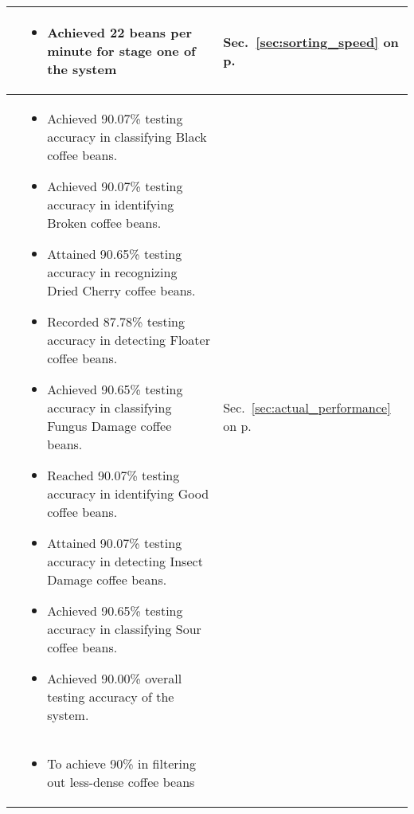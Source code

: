 \begin{center}
{\begin{tabularx}{\textwidth}{p{}|p{}|p{}}
			
			\Paste{SO2} & 

			\begin{itemize}
				\item Achieved 22 beans per minute for stage one of the system
			\end{itemize} 
	
			& Sec.~\ref{sec:sorting_speed} on p.~\pageref{sec:sorting_speed}
			\\ \hline
			
			\Paste{SO3} & 
			\begin{itemize}
				\item Achieved 90.07\% testing accuracy in classifying Black coffee beans.
				\item Achieved 90.07\% testing accuracy in identifying Broken coffee beans.
				\item Attained 90.65\% testing accuracy in recognizing Dried Cherry coffee beans.
				\item Recorded 87.78\% testing accuracy in detecting Floater coffee beans.
				\item Achieved 90.65\% testing accuracy in classifying Fungus Damage coffee beans.
				\item Reached  90.07\% testing accuracy in identifying Good coffee beans.
				\item Attained 90.07\% testing accuracy in detecting Insect Damage coffee beans.
				\item Achieved 90.65\% testing accuracy in classifying Sour coffee beans.
				\item Achieved 90.00\% overall testing accuracy of the system.
			\end{itemize} 
			& Sec.~\ref{sec:actual_performance} on p.~\pageref{sec:actual_performance}\\ \hline
			
			
			\Paste{SO4} &
			\begin{itemize}
				\item To achieve 90\% in filtering out less-dense coffee beans
			\end{itemize}
			& 			\\ \hline
			
		\end{tabularx}
	}
\end{center}

